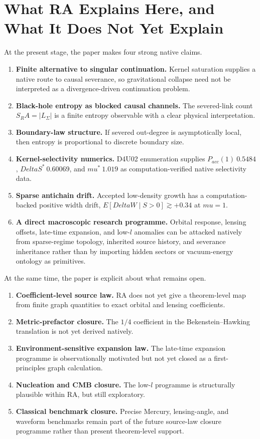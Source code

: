 \documentclass[11pt]{article}
\def\ell{l}%
\def\Delta{Delta}%
\def\mu{mu}%
\def\mathrm#1{#1}%
\def\mathbb#1{#1}%
\def\approx{~}%
\def\SRa{S_RA}%
\newcommand{\SRa}{\ensuremath{S_{\mathrm{RA}}}}
\begin{document}
\section{What RA Explains Here, and What It Does Not Yet Explain}

At the present stage, the paper makes four strong native claims.
\begin{enumerate}[nosep]
    \item \textbf{Finite alternative to singular continuation.} Kernel saturation supplies a native route to causal severance, so gravitational collapse need not be interpreted as a divergence-driven continuation problem.
    \item \textbf{Black-hole entropy as blocked causal channels.} The severed-link count $\SRa=|L_\Sigma|$ is a finite entropy observable with a clear physical interpretation.
    \item \textbf{Boundary-law structure.} If severed out-degree is asymptotically local, then entropy is proportional to discrete boundary size.
    \item \textbf{Kernel-selectivity numerics.} D4U02 enumeration supplies $P_{\mathrm{acc}}(1)\approx0.5484$, $\Delta S^*\approx0.60069$, and $\mu^*\approx1.019$ as computation-verified native selectivity data.
    \item \textbf{Sparse antichain drift.} Accepted low-density growth has a computation-backed positive width drift, $\mathbb{E}[\Delta W\mid S>0]\gtrsim+0.34$ at $\mu=1$.
    \item \textbf{A direct macroscopic research programme.} Orbital response, lensing offsets, late-time expansion, and low-$\ell$ anomalies can be attacked natively from sparse-regime topology, inherited source history, and severance inheritance rather than by importing hidden sectors or vacuum-energy ontology as primitives.
\end{enumerate}

At the same time, the paper is explicit about what remains open.
\begin{enumerate}[nosep]
    \item \textbf{Coefficient-level source law.} RA does not yet give a theorem-level map from finite graph quantities to exact orbital and lensing coefficients.
    \item \textbf{Metric-prefactor closure.} The $1/4$ coefficient in the Bekenstein--Hawking translation is not yet derived natively.
    \item \textbf{Environment-sensitive expansion law.} The late-time expansion programme is observationally motivated but not yet closed as a first-principles graph calculation.
    \item \textbf{Nucleation and CMB closure.} The low-$\ell$ programme is structurally plausible within RA, but still exploratory.
    \item \textbf{Classical benchmark closure.} Precise Mercury, lensing-angle, and waveform benchmarks remain part of the future source-law closure programme rather than present theorem-level support.
\end{enumerate}
\end{document}
